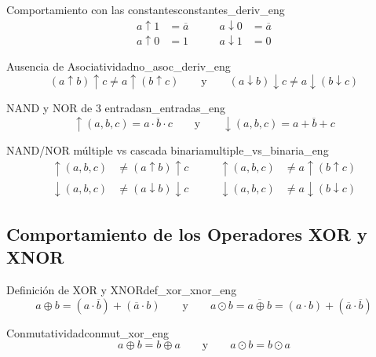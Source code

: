 \setcounter{tcb@cnt@teorema}{18}
\begin{teorema}{Comportamiento con las constantes}{constantes_deriv_eng}
\begin{align*}
    a \uparrow 1 &= \overline{a} \qquad & a \downarrow 0 &= \overline{a} \\
    a \uparrow 0 &= 1 \qquad & a \downarrow 1 &= 0
\end{align*}
\end{teorema}

\setcounter{tcb@cnt@teorema}{19}
\begin{teorema}{Ausencia de Asociatividad}{no_asoc_deriv_eng}
\[ (a \uparrow b) \uparrow c \neq a \uparrow (b \uparrow c) \qquad \text{y} \qquad (a \downarrow b) \downarrow c \neq a \downarrow (b \downarrow c) \]
\end{teorema}

\setcounter{tcb@cnt@definicion}{6}
\begin{definicion}{NAND y NOR de 3 entradas}{n_entradas_eng}
\[ \uparrow(a,b,c) = \overline{a \cdot b \cdot c} \qquad \text{y} \qquad \downarrow(a,b,c) = \overline{a + b + c} \]
\end{definicion}

\setcounter{tcb@cnt@teorema}{20}
\begin{teorema}{NAND/NOR múltiple vs cascada binaria}{multiple_vs_binaria_eng}
\begin{align*}
    \uparrow(a,b,c) &\neq (a \uparrow b) \uparrow c \qquad & \uparrow(a,b,c) &\neq a \uparrow (b \uparrow c) \\
    \downarrow(a,b,c) &\neq (a \downarrow b) \downarrow c \qquad & \downarrow(a,b,c) &\neq a \downarrow (b \downarrow c)
\end{align*}
\end{teorema}
\subsection*{Comportamiento de los Operadores XOR y XNOR}

\setcounter{tcb@cnt@definicion}{4}
\begin{definicion}{Definición de XOR y XNOR}{def_xor_xnor_eng}
\[ a \oplus b = (a \cdot \overline{b}) + (\overline{a} \cdot b) \qquad \text{y} \qquad a \odot b = \overline{a \oplus b} = (a \cdot b) + (\overline{a} \cdot \overline{b}) \]
\end{definicion}

\setcounter{tcb@cnt@teorema}{22}
\begin{teorema}{Conmutatividad}{conmut_xor_eng}
\[ a \oplus b = b \oplus a \qquad \text{y} \qquad a \odot b = b \odot a \]
\end{teorema}

